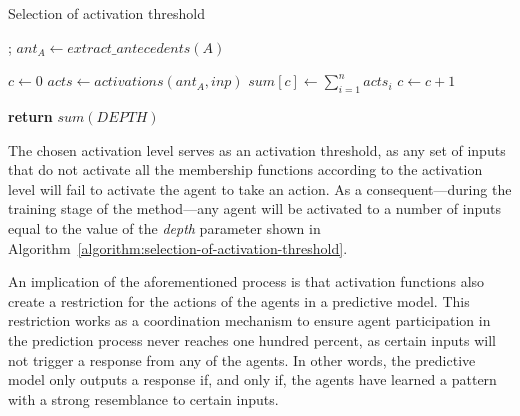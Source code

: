 \documentclass{ieeeaccess}
\begin{document}
\begin{algorithm}
  \caption{Selection of activation threshold}
  \label{algorithm:selection-of-activation-threshold}
  \begin{algorithmic}[1]
    ;
    \State $ant_A\gets extract\_antecedents(A)$

    \State $c\gets 0$
    \State $acts \gets activations(ant_A, inp)$
    \State $sum[c] \gets \sum_{i = 1}^{n} acts_i$
    \State $c \gets c + 1$
    \EndFor

    \State \textbf{return} $sum(DEPTH)$
    \EndProcedure
  \end{algorithmic}
\end{algorithm}


The chosen activation level serves as an activation threshold, as any set of
inputs that do not activate all the membership functions according to the
activation level will fail to activate the agent to take an action. As a
consequent---during the training stage of the method---any agent will be
activated to a number of inputs equal to the value of the \textit{depth}
parameter shown in Algorithm~\ref{algorithm:selection-of-activation-threshold}.

An implication of the aforementioned process is that activation functions also
create a restriction for the actions of the agents in a predictive model. This
restriction works as a coordination mechanism to ensure agent participation in
the prediction process never reaches one hundred percent, as certain 
inputs will not trigger a response from any of the agents. In other words, the
predictive model only outputs a response if, and only if, the agents have learned
a pattern with a strong resemblance to certain inputs.
\end{document}
